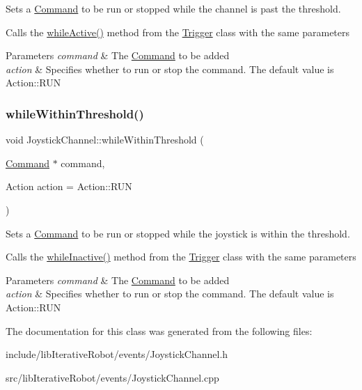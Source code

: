 Sets a \mbox{\hyperlink{classlib_iterative_robot_1_1_command}{Command}} to be run or stopped while the channel is past the threshold. 

Calls the \mbox{\hyperlink{classlib_iterative_robot_1_1_trigger_a66c9e7fe16d1907aed3f7b3c51bb8917}{while\+Active()}} method from the \mbox{\hyperlink{classlib_iterative_robot_1_1_trigger}{Trigger}} class with the same parameters


\begin{DoxyParams}{Parameters}
{\em command} & The \mbox{\hyperlink{classlib_iterative_robot_1_1_command}{Command}} to be added \\
\hline
{\em action} & Specifies whether to run or stop the command. The default value is Action\+::\+R\+UN \\
\hline
\end{DoxyParams}
\mbox{\label{classlib_iterative_robot_1_1_joystick_channel_ac69e7ff6ba69d85a614d6e847a0aae5d}} 
\subsubsection{\texorpdfstring{whileWithinThreshold()}{whileWithinThreshold()}}
{\footnotesize\ttfamily void Joystick\+Channel\+::while\+Within\+Threshold (\begin{DoxyParamCaption}\item[{\mbox{\hyperlink{classlib_iterative_robot_1_1_command}{Command}} $\ast$}]{command,  }\item[{Action}]{action = {\ttfamily Action\+:\+:RUN} }\end{DoxyParamCaption})}



Sets a \mbox{\hyperlink{classlib_iterative_robot_1_1_command}{Command}} to be run or stopped while the joystick is within the threshold. 

Calls the \mbox{\hyperlink{classlib_iterative_robot_1_1_trigger_a7de90fbdaa1d6450f6f1bc532af85686}{while\+Inactive()}} method from the \mbox{\hyperlink{classlib_iterative_robot_1_1_trigger}{Trigger}} class with the same parameters


\begin{DoxyParams}{Parameters}
{\em command} & The \mbox{\hyperlink{classlib_iterative_robot_1_1_command}{Command}} to be added \\
\hline
{\em action} & Specifies whether to run or stop the command. The default value is Action\+::\+R\+UN \\
\hline
\end{DoxyParams}


The documentation for this class was generated from the following files\+:\begin{DoxyCompactItemize}
\item 
include/lib\+Iterative\+Robot/events/Joystick\+Channel.\+h\item 
src/lib\+Iterative\+Robot/events/Joystick\+Channel.\+cpp\end{DoxyCompactItemize}
